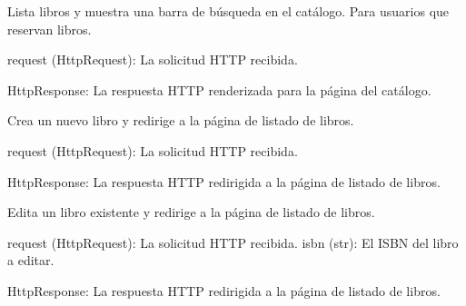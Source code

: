 \documentclass[letterpaper,10pt,spanish]{sphinxmanual}
\begin{document}
\begin{fulllineitems}
\label{\detokenize{modules/appejemplares:appejemplares.views.catalogo}}
\pysigstartsignatures
{}
\pysigstopsignatures
\sphinxAtStartPar
Lista libros y muestra una barra de búsqueda en el catálogo.
Para usuarios que reservan libros.
\begin{description}
\sphinxAtStartPar
request (HttpRequest): La solicitud HTTP recibida.

\sphinxAtStartPar
HttpResponse: La respuesta HTTP renderizada para la página del catálogo.

\end{description}

\end{fulllineitems}


\begin{fulllineitems}
\label{\detokenize{modules/appejemplares:appejemplares.views.crear}}
\pysigstartsignatures
{}
\pysigstopsignatures
\sphinxAtStartPar
Crea un nuevo libro y redirige a la página de listado de libros.
\begin{description}
\sphinxAtStartPar
request (HttpRequest): La solicitud HTTP recibida.

\sphinxAtStartPar
HttpResponse: La respuesta HTTP redirigida a la página de listado de libros.

\end{description}

\end{fulllineitems}


\begin{fulllineitems}
\label{\detokenize{modules/appejemplares:appejemplares.views.editar}}
\pysigstartsignatures
{}
\pysigstopsignatures
\sphinxAtStartPar
Edita un libro existente y redirige a la página de listado de libros.
\begin{description}
\sphinxAtStartPar
request (HttpRequest): La solicitud HTTP recibida.
isbn (str): El ISBN del libro a editar.

\sphinxAtStartPar
HttpResponse: La respuesta HTTP redirigida a la página de listado de libros.

\end{description}

\end{fulllineitems}
\end{document}
